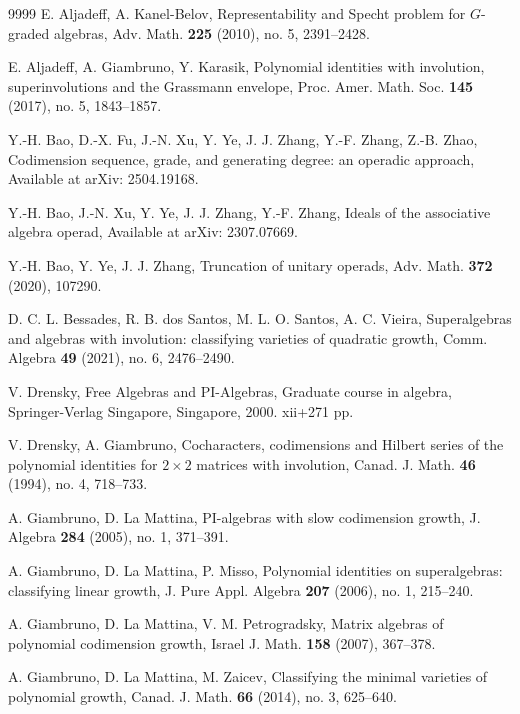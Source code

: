 \documentclass{amsart}
\theoremstyle{definition}
\theoremstyle{remark}
\numberwithin{equation}{section}
\begin{document}
\makeatletter
\renewcommand{\@biblabel}[1]{\hfill\mbox{[#1]}} 
\begin{thebibliography}{9999}
	\raggedbottom
	E. Aljadeff, A. Kanel-Belov,
	Representability and Specht problem for  $G$-graded algebras,
	Adv. Math. {\bf 225} (2010), no. 5, 2391–2428.
	
	E. Aljadeff, A. Giambruno, Y. Karasik,
	Polynomial identities with involution, superinvolutions and the Grassmann envelope,
	Proc. Amer. Math. Soc. {\bf 145} (2017), no. 5, 1843–1857.
	
	Y.-H. Bao, D.-X. Fu, J.-N. Xu, Y. Ye, J. J. Zhang, Y.-F. Zhang, Z.-B. Zhao,
	Codimension sequence, grade, and generating degree: an operadic approach,
	Available at arXiv: 2504.19168.
	
	Y.-H. Bao, J.-N. Xu, Y. Ye, J. J. Zhang, Y.-F. Zhang,
	Ideals of the associative algebra operad, 
	Available at arXiv: 2307.07669.
	
	Y.-H. Bao, Y. Ye, J. J. Zhang, 
	Truncation of unitary operads, 
	Adv. Math. {\bf 372} (2020), 107290.
	
	D. C. L. Bessades, R. B. dos Santos, M. L. O. Santos, A. C. Vieira, 
	Superalgebras and algebras with involution: classifying varieties of quadratic growth,
	Comm. Algebra {\bf 49} (2021), no. 6, 2476–2490.
	
	V. Drensky, 
	Free Algebras and PI-Algebras, Graduate course in algebra,
	Springer-Verlag Singapore, Singapore, 2000. xii+271 pp.
	
	V. Drensky, A. Giambruno,
	Cocharacters, codimensions and Hilbert series of the polynomial identities for  $2 \times 2$  matrices with involution,
	Canad. J. Math. {\bf 46} (1994), no. 4, 718–733.

	A. Giambruno, D. La Mattina,
	PI-algebras with slow codimension growth,
	J. Algebra {\bf 284} (2005), no. 1, 371–391.
	
	A. Giambruno, D. La Mattina, P. Misso,
	Polynomial identities on superalgebras: classifying linear growth,
	J. Pure Appl. Algebra {\bf 207} (2006), no. 1, 215–240.
	
	A. Giambruno, D. La Mattina, V. M. Petrogradsky, 
	Matrix algebras of polynomial codimension growth, 
	Israel J. Math. {\bf 158} (2007), 367--378.
	
	A. Giambruno, D. La Mattina,  M. Zaicev, 
	Classifying the minimal varieties of polynomial growth, 
	Canad. J. Math. {\bf 66} (2014), no. 3, 625--640.
	

\end{thebibliography}
\end{document}
